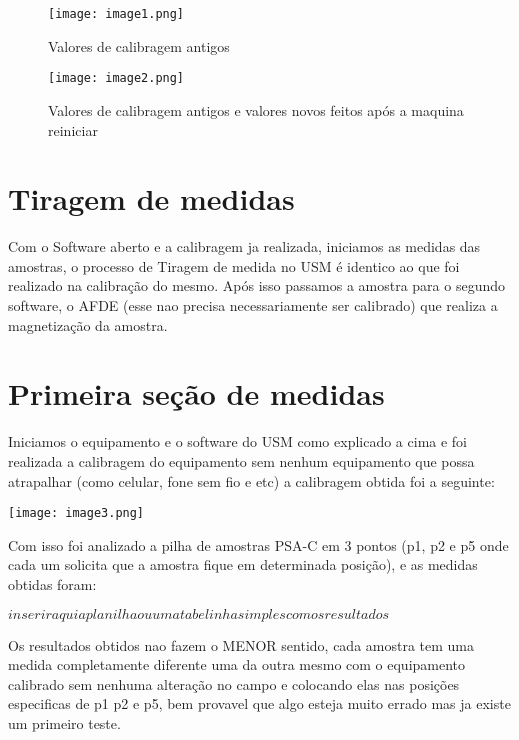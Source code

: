 \documentclass{paper}[geophysics]
\begin{document}
\newpage

\begin{figure}
    \centering
    \texttt{[image: image1.png]}
    \caption{Valores de calibragem antigos}
    \label{fig:enter-label}
\end{figure}

\begin{figure}
    \centering
    \texttt{[image: image2.png]}
    \caption{Valores de calibragem antigos e valores novos feitos após a maquina reiniciar}
    \label{fig:enter-label}
\end{figure}

\section{Tiragem de medidas}
Com o Software aberto e a calibragem ja realizada, iniciamos as medidas das amostras, o processo de Tiragem de medida no USM é identico ao que foi realizado na calibração do mesmo. Após isso passamos a amostra para o segundo software, o AFDE (esse nao precisa necessariamente ser calibrado) que realiza a magnetização da amostra.

\newpage

\section{Primeira seção de medidas}
Iniciamos o equipamento e o software do USM como explicado a cima e foi realizada a calibragem do equipamento sem nenhum equipamento que possa atrapalhar (como celular, fone sem fio e etc)
a calibragem obtida foi a seguinte:\\

\begin{center}
    \texttt{[image: image3.png]}
\end{center}

Com isso foi analizado a pilha de amostras PSA-C em 3 pontos (p1, p2 e p5 onde cada um solicita que a amostra fique em determinada posição), e as medidas obtidas foram:

$inserir aqui a planilha ou uma tabelinha simples com os resultados$

Os resultados obtidos nao fazem o MENOR sentido, cada amostra tem uma medida completamente diferente uma da outra mesmo com o equipamento calibrado sem nenhuma alteração no campo e colocando elas nas posições especificas de p1 p2 e p5, bem provavel que algo esteja muito errado mas ja existe um primeiro teste.
\end{document}
